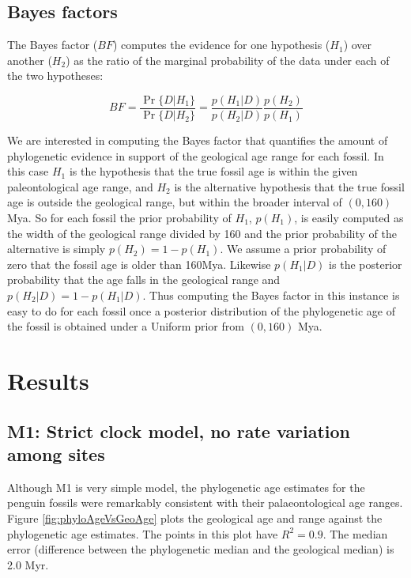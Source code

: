 \documentclass[11pt]{article}
\newcommand{\Mstrict}{{M1}}
\begin{document}
\subsection*{Bayes factors}

The Bayes factor ($BF$) computes the evidence for one hypothesis ($H_1$) over another ($H_2$) as the ratio of the marginal probability of the data under each of the two hypotheses:

\begin{equation}
BF = \frac{\Pr\{D|H_1\}}{\Pr\{D|H_2\}} = \frac{p(H_1|D)}{p(H_2|D)}\frac{p(H_2)}{p(H_1)}
\end{equation}

We are interested in computing the Bayes factor that quantifies the amount of phylogenetic evidence in support of the geological age range for each fossil. In this case $H_1$ is the hypothesis that the true fossil age is within the given paleontological age range, and $H_2$ is the alternative hypothesis that the true fossil age is outside the geological range, but within the broader interval of $(0,160)$ Mya. So for each fossil the prior probability of $H_1$, $p(H_1)$, is easily computed as the width of the geological range divided by 160 and the prior probability of the alternative is simply $p(H_2) = 1 - p(H_1)$. We assume a prior probability of zero that the fossil age is older than 160Mya. Likewise $p(H_1 | D)$ is the posterior probability that the age falls in the geological range and $p(H_2 | D) = 1 - p(H_1 | D)$. Thus computing the Bayes factor in this instance is easy to do for each fossil once a posterior distribution of the phylogenetic age of the fossil is obtained under a Uniform prior from $(0,160)$ Mya.

\section*{Results}


\subsection*{\Mstrict{}: Strict clock model, no rate variation among sites}
Although \Mstrict{} is very simple model, the phylogenetic age estimates for the penguin fossils were remarkably consistent with their palaeontological age ranges. Figure \ref{fig:phyloAgeVsGeoAge} plots the geological age and range against the phylogenetic age estimates. The points in this plot have $R^2 = 0.9$. The median error (difference between the phylogenetic median and the geological median) is 2.0 Myr.
\end{document}
